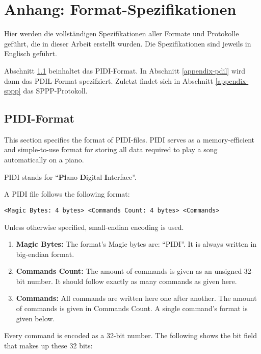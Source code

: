 \chapter{Anhang: Format-Spezifikationen} \label{appendix-specs}

Hier werden die vollständigen Spezifikationen aller Formate und Protokolle geführt, die in dieser Arbeit erstellt wurden.
Die Spezifikationen sind jeweils in Englisch geführt.

Abschnitt \ref{appendix-pidi} beinhaltet das \ac{PIDI}-Format.
In Abschnitt \ref{appendix-pdil} wird dann das \ac{PDIL}-Format spezifziert.
Zuletzt findet sich in Abschnitt \ref{appendix-sppp} das \ac{SPPP}-Protokoll.

\section{PIDI-Format} \label{appendix-pidi}

This section specifies the format of PIDI-files.
PIDI serves as a memory-efficient and simple-to-use format for storing all data required to play a song automatically on a piano.

PIDI stands for \enquote{\textbf{Pi}ano \textbf{D}igital \textbf{I}nterface}.

A PIDI file follows the following format:

\begin{verbatim}
<Magic Bytes: 4 bytes> <Commands Count: 4 bytes> <Commands>
\end{verbatim}

Unless otherwise specified, small-endian encoding is used.

\begin{enumerate}
	\item \textbf{Magic Bytes:} The format's Magic bytes are: \enquote{PIDI}. It is always written in big-endian format.
	\item \textbf{Commands Count:} The amount of commands is given as an unsigned 32-bit number. It should follow exactly as many commands as given here.
	\item \textbf{Commands:} All commands are written here one after another. The amount of commands is given in Commands Count. A single command's format is given below.
\end{enumerate}

Every command is encoded as a 32-bit number. The following shows the bit field that makes up these 32 bits:

